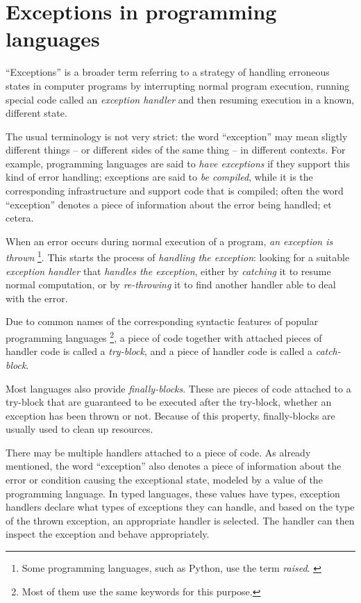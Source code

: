 \chapter{Exceptions in programming languages}

``Exceptions'' is a broader term referring to a strategy of handling erroneous
states in computer programs by interrupting normal program execution, running special
code called an \emph{exception handler} and then resuming execution in a known, different
state.

The usual terminology is not very strict: the word ``exception'' may mean sligtly
different things -- or different sides of the same thing -- in different contexts.
For example, programming languages are said to \emph{have exceptions} if they support
this kind of error handling; exceptions are said to \emph{be compiled}, while it is the
corresponding infrastructure and support code that is compiled; often the word ``exception''
denotes a piece of information about the error being handled; et cetera.

When an error occurs during normal execution of a program, \emph{an exception is thrown}%
\footnote{Some programming languages, such as Python, use the term \emph{raised}.%
\cite{python:reference}}.
This starts the
process of \emph{handling the exception}: looking for a suitable%
\emph{exception handler} that \emph{handles the exception}, either by \emph{catching} it
to resume normal computation, or by \emph{re-throwing} it to find another handler
able to deal with the error.

Due to common names of the corresponding syntactic features of popular programming languages%
\footnote{Most of them use the same keywords for this purpose.},
a piece of code together with attached pieces of handler code is called a \emph{try-block},
and a piece of handler code is called a \emph{catch-block}.

Most languages also provide \emph{finally-blocks}. These are pieces of code attached to a
try-block that are guaranteed to be executed after the try-block, whether an exception
has been thrown or not. Because of this property, finally-blocks are usually used to clean up
resources.

There may be multiple handlers attached to a piece of code.
As already mentioned, the word ``exception'' also denotes a piece of information about
the error or condition causing the exceptional state, modeled by a value of the programming
language. In typed languages, these values have types, exception handlers declare what
types of exceptions they can handle, and based on the type of the thrown exception,
an appropriate handler is selected. The handler can then inspect the exception and
behave appropriately.

